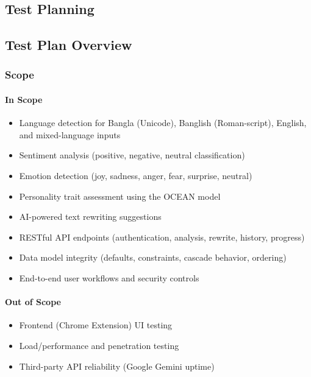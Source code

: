 \documentclass[12pt,a4paper]{report}
\begin{document}
\begin{itemize}
\chapter{Test Planning}

\section{Test Plan Overview}

\subsection{Scope}

\subsubsection{In Scope}

\begin{itemize}
    \item Language detection for Bangla (Unicode), Banglish (Roman-script), English, and mixed-language inputs
    \item Sentiment analysis (positive, negative, neutral classification)
    \item Emotion detection (joy, sadness, anger, fear, surprise, neutral)
    \item Personality trait assessment using the OCEAN model
    \item AI-powered text rewriting suggestions
    \item RESTful API endpoints (authentication, analysis, rewrite, history, progress)
    \item Data model integrity (defaults, constraints, cascade behavior, ordering)
    \item End-to-end user workflows and security controls
\end{itemize}

\subsubsection{Out of Scope}

\begin{itemize}
    \item Frontend (Chrome Extension) UI testing
    \item Load/performance and penetration testing
    \item Third-party API reliability (Google Gemini uptime)
\end{itemize}


\end{itemize}
\end{document}

